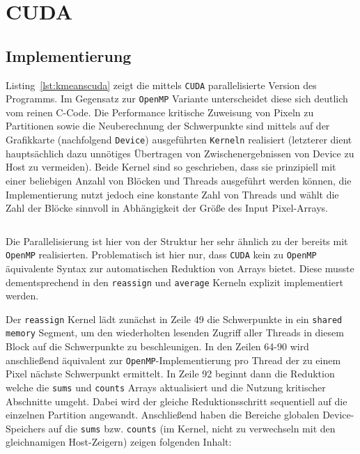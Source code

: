 \documentclass[
    bibliography=totoc, cd=lightcolor, cdmath=false, ngerman]{tudscrreprt}
\begin{document}
\section{CUDA}

\subsection{Implementierung}

Listing~\ref{lst:kmeanscuda} zeigt die mittels \texttt{CUDA} parallelisierte
Version des Programms. Im Gegensatz zur \texttt{OpenMP} Variante unterscheidet
diese sich deutlich vom reinen C-Code. Die Performance kritische Zuweisung von
Pixeln zu Partitionen sowie die Neuberechnung der Schwerpunkte sind mittels auf
der Grafikkarte (nachfolgend \texttt{Device}) ausgeführten \texttt{Kerneln}
realisiert (letzterer dient hauptsächlich dazu unnötiges Übertragen von
Zwischenergebnissen von Device zu Host zu vermeiden). Beide Kernel sind so
geschrieben, dass sie prinzipiell mit einer beliebigen Anzahl von Blöcken und
Threads ausgeführt werden können, die Implementierung nutzt jedoch eine
konstante Zahl von Threads und wählt die Zahl der Blöcke sinnvoll in
Abhängigkeit der Größe des Input Pixel-Arrays.

\inputminted[label=kmeanscuda]{CUDA}{c/src/kmeans.cu}

Die Parallelisierung ist hier von der Struktur her sehr ähnlich zu der bereits
mit \texttt{OpenMP} realisierten. Problematisch ist hier nur, dass
\texttt{CUDA} kein zu \texttt{OpenMP} äquivalente Syntax zur automatischen
Reduktion von Arrays bietet. Diese musste dementsprechend in
den \texttt{reassign} und \texttt{average} Kerneln explizit implementiert
werden.

Der \texttt{reassign} Kernel lädt zunächst in Zeile 49 die Schwerpunkte in ein
\texttt{shared memory} Segment, um den wiederholten lesenden Zugriff aller
Threads in diesem Block auf die Schwerpunkte zu beschleunigen. In den Zeilen
64-90 wird anschließend äquivalent zur \texttt{OpenMP}-Implementierung pro
Thread der zu einem Pixel nächste Schwerpunkt ermittelt. In Zeile 92 beginnt
dann die Reduktion welche die \texttt{sums} und \texttt{counts} Arrays
aktualisiert und die Nutzung kritischer Abschnitte umgeht. Dabei wird der
gleiche Reduktionsschritt sequentiell auf die einzelnen Partition angewandt.
Anschließend haben die Bereiche globalen Device-Speichers auf die \texttt{sums}
bzw. \texttt{counts} (im Kernel, nicht zu verwechseln mit den gleichnamigen
Host-Zeigern) zeigen folgenden Inhalt:
\end{document}
